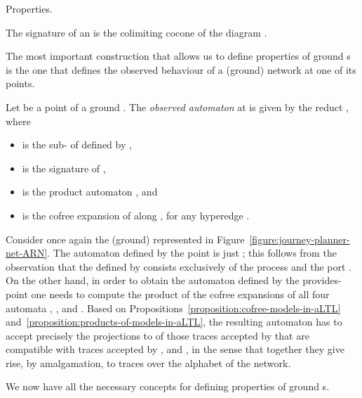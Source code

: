 \documentclass{LMCS}
\begin{document}
\begin{minisection}{Properties.}
    \begin{defi}
      The signature of an   is the colimiting cocone  of the diagram .
    \end{defi}

    The most important construction that allows us to define properties of ground s is the one that defines the observed behaviour of a (ground) network at one of its points.

    \begin{defi}
      \label{definition:observed-automaton}
      Let  be a point of a ground  .
      The \emph{observed automaton}  at  is given by the reduct , where
      \begin{itemize}
        
      \item  is the sub- of  defined by ,
        
      \item  is the signature of ,
        
      \item  is the product automaton , and
        
      \item  is the cofree expansion of  along , for any hyperedge .
        
      \end{itemize}
    \end{defi}

    \begin{exa}
      Consider once again the (ground)  represented in Figure~\ref{figure:journey-planner-net-ARN}.
      The automaton defined by the point  is just ; this follows from the observation that the  defined by  consists exclusively of the process  and the port .
      On the other hand, in order to obtain the automaton defined by the provides-point  one needs to compute the product of the cofree expansions of all four automata , ,  and .
      Based on Propositions~\ref{proposition:cofree-models-in-aLTL} and~\ref{proposition:products-of-models-in-aLTL}, the resulting automaton has to accept precisely the projections to  of those traces accepted by  that are compatible with traces accepted by ,  and , in the sense that together they give rise, by amalgamation, to traces over the alphabet of the network.
    \end{exa}

    We now have all the necessary concepts for defining properties of ground s.


\end{minisection}
\end{document}
